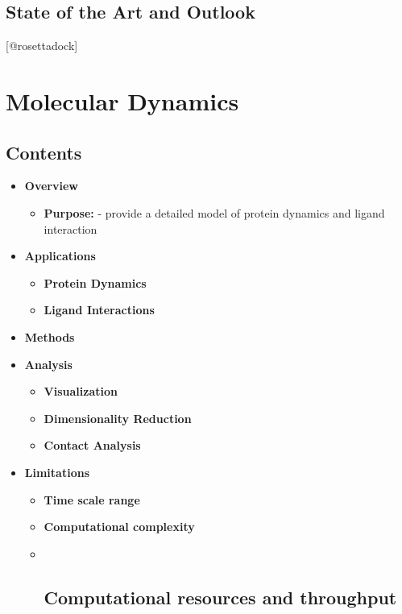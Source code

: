 \hypertarget{state-of-the-art-and-outlook}{%
\subsection{State of the Art and
Outlook}\label{state-of-the-art-and-outlook}}

{[}@rosettadock{]}

\bib

\hypertarget{molecular-dynamics}{%
\section{Molecular Dynamics}\label{molecular-dynamics}}

\hypertarget{contents-11}{%
\subsection{Contents}\label{contents-11}}

\begin{itemize}
\tightlist
\item
  \textbf{Overview}

  \begin{itemize}
  \tightlist
  \item
    \textbf{Purpose:} - provide a detailed model of protein dynamics and
    ligand interaction
  \end{itemize}
\item
  \textbf{Applications}

  \begin{itemize}
  \tightlist
  \item
    \textbf{Protein Dynamics}
  \item
    \textbf{Ligand Interactions}
  \end{itemize}
\item
  \textbf{Methods}
\item
  \textbf{Analysis}

  \begin{itemize}
  \tightlist
  \item
    \textbf{Visualization}
  \item
    \textbf{Dimensionality Reduction}
  \item
    \textbf{Contact Analysis}
  \end{itemize}
\item
  \textbf{Limitations}

  \begin{itemize}
  \item
    \textbf{Time scale range}
  \item
    \textbf{Computational complexity}
  \item ~
    \hypertarget{computational-resources-and-throughput}{%
    \subsection{\texorpdfstring{\textbf{Computational resources and
    throughput}}{Computational resources and throughput}}\label{computational-resources-and-throughput}}
  \end{itemize}
\end{itemize}

